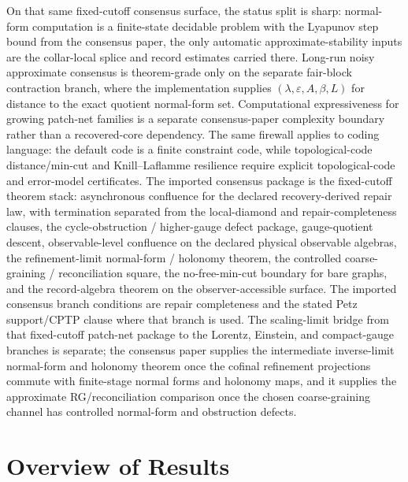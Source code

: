 \documentclass[11pt]{article}
\begin{document}
On that same fixed-cutoff consensus surface, the status split is sharp: normal-form computation is
a finite-state decidable problem with the Lyapunov step bound from the consensus paper, the only
automatic approximate-stability inputs are the collar-local splice and record estimates carried
there. Long-run noisy approximate consensus is theorem-grade only on the separate fair-block
contraction branch, where the implementation supplies \((\lambda,\varepsilon,A,\beta,L)\) for
distance to the exact quotient normal-form set. Computational expressiveness for growing
patch-net families is a separate consensus-paper complexity boundary rather than a recovered-core
dependency. The same firewall applies to coding
language: the default code is a finite constraint code, while topological-code distance/min-cut and
Knill--Laflamme resilience require explicit topological-code and error-model certificates.
The imported consensus package is the fixed-cutoff theorem stack: asynchronous confluence
for the declared recovery-derived repair law, with termination separated from the local-diamond and repair-completeness clauses, the cycle-obstruction / higher-gauge defect package,
gauge-quotient descent, observable-level confluence on the declared physical observable algebras,
the refinement-limit normal-form / holonomy theorem, the controlled coarse-graining /
reconciliation square, the no-free-min-cut boundary for bare graphs, and the record-algebra theorem on the observer-accessible surface. The imported consensus
branch conditions are repair completeness and the stated Petz support/CPTP clause where that branch is used.
The scaling-limit bridge from that fixed-cutoff patch-net package to the Lorentz, Einstein, and
compact-gauge branches is separate; the consensus paper supplies the intermediate inverse-limit
normal-form and holonomy theorem once the cofinal refinement projections commute with finite-stage
normal forms and holonomy maps, and it supplies the approximate RG/reconciliation comparison once
the chosen coarse-graining channel has controlled normal-form and obstruction defects.

\section{Overview of Results}
\end{document}
